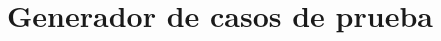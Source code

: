 \documentclass[10pt]{article} %
\begin{document}
%	
%		
%			
%		


	
	
	\section{Generador de casos de prueba}
	
\end{document}
